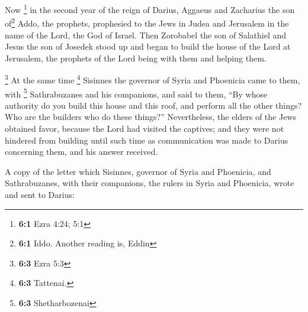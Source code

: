  Now \footnote{\textbf{6:1} Ezra 4:24; 5:1} in the second
year of the reign of Darius, Aggaeus and Zacharius the son of\footnote{\textbf{6:1}
  Iddo. Another reading is, Eddin} Addo, the prophets, prophesied to the
Jews in Judea and Jerusalem in the name of the Lord, the God of Israel.
 Then Zorobabel the son of Salathiel and Jesus the son of
Josedek stood up and began to build the house of the Lord at Jerusalem,
the prophets of the Lord being with them and helping them.

 \footnote{\textbf{6:3} Ezra 5:3} At the same time
\footnote{\textbf{6:3} Tattenai.} Sisinnes the governor of Syria and
Phoenicia came to them, with \footnote{\textbf{6:3} Shetharbozenai}
Sathrabuzanes and his companions, and said to them,  ``By
whose authority do you build this house and this roof, and perform all
the other things? Who are the builders who do these things?''
 Nevertheless, the elders of the Jews obtained favor,
because the Lord had visited the captives;  and they were
not hindered from building until such time as communication was made to
Darius concerning them, and his answer received.

 A copy of the letter which Sisinnes, governor of Syria
and Phoenicia, and Sathrabuzanes, with their companions, the rulers in
Syria and Phoenicia, wrote and sent to Darius:

